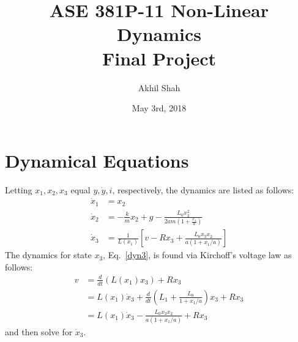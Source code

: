 \documentclass{article}
\title{ASE 381P-11 \- Non-Linear Dynamics \\ Final Project}
\author{Akhil Shah}
\date{May 3rd, 2018}
\begin{document}
\maketitle

\section{Dynamical Equations}
Letting $x_1, x_2, x_3$ equal $y, \dot{y}, i$, respectively, the dynamics are listed as follows:
\begin{align}
    \dot{x}_1 &= x_2 \\
    \dot{x}_2 &= -\frac{k}{m}x_2 + g - \frac{L_0x_3^2}{2am(1+\frac{x_1}{a})} \\
    \dot{x}_3 &= \frac{1}{L(x_1)}\left[ v - Rx_3 + \frac{L_0x_3x_2}{a(1+x_1/a)}\right] \label{dyn3}
\end{align}
The dynamics for state $x_3$, Eq.~\ref{dyn3}, is found via Kirchoff's voltage law as follows:
\begin{align*}
    v &= \frac{d}{dt}(L(x_1)x_3) + Rx_3 \\
    &= L(x_1)\dot{x}_3 + \frac{d}{dt}\left(L_1 + \frac{L_0}{1 + x_1/a}\right)x_3 + Rx_3 \\
    &= L(x_1)\dot{x}_3 - \frac{L_0x_3x_2}{a(1+x_1/a)} + Rx_3
\end{align*}
and then solve for $\dot{x}_3$.
\end{document}
